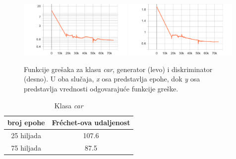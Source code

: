 \documentclass[12pt,oneside]{memoir}
\begin{document}
\begin{figure}[!htbp]
\centering
  \includegraphics[width=0.49\textwidth]{matfmaster/stylegan/car/g_loss.png}
  \includegraphics[width=0.49\textwidth]{matfmaster/stylegan/car/d_loss.png}
\caption{Funkcije grešaka za klasu \textit{car}, generator (levo) i diskriminator (desno). U oba slučaja, \textit{x} osa predstavlja epohe, dok \textit{y} osa predstavlja vrednosti odgovarajuće funkcije greške.}\label{fig:section4_stylegan_car_loss}
\end{figure}


\begin{table}[!htb]
\caption{Klasa \textit{car}}\label{tab:section4_fid_c}
\centering
    \begin{tabular}{c|c}
        broj epohe &  Fréchet-ova udaljenost \\
        \hline
        25 hiljada & 107.6 \\
        \hline
        75 hiljada & 87.5 \\
    \end{tabular}
\end{table}
\end{document}
